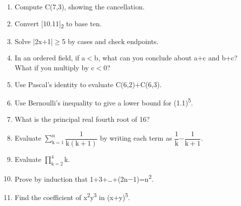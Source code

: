 \documentclass[11pt]{article}
\begin{document}
\begin{keepsection}
\begin{enumerate}
\item Compute C(7,3), showing the cancellation.
\item Convert [10.11]\textsubscript{2} to base ten.
\item Solve |2x+1|\ensuremath{\geq}5 by cases and check endpoints.
\item In an ordered field, if a\ensuremath{<}b, what can you conclude about a+c and b+c? What if you multiply by c\ensuremath{<}0?
\item Use Pascal’s identity to evaluate C(6,2)+C(6,3).
\item Use Bernoulli’s inequality to give a lower bound for (1.1)\textsuperscript{5}.
\item What is the principal real fourth root of 16?
\item Evaluate $\sum_{\mathrm{k}=1}^{\mathrm{n}} ${\small\ensuremath{\dfrac{1}{\mathrm{k}(\mathrm{k}+1)}}} by writing each term as {\small\ensuremath{\dfrac{1}{\mathrm{k}}}}\ensuremath{-}{\small\ensuremath{\dfrac{1}{\mathrm{k}+1}}}.
\item Evaluate $\prod_{\mathrm{k}=2}^{4} $k.
\item Prove by induction that 1+3+…+(2n\ensuremath{-}1)=n\textsuperscript{2}.
\item Find the coefficient of x\textsuperscript{2}y\textsuperscript{3} in (x+y)\textsuperscript{5}.
\end{enumerate}

\end{keepsection}
\end{document}
